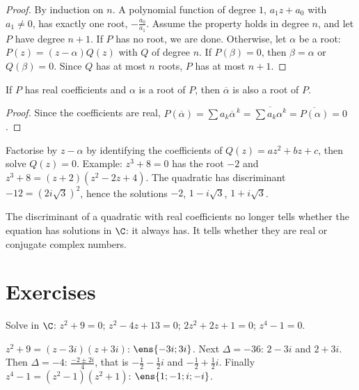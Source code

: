 \begin{proof}
By induction on $n$. A polynomial function of degree $1$, $a_1z+a_0$ with $a_1\neq0$, has exactly one root, $-\frac{a_0}{a_1}$. Assume the property holds in degree $n$, and let $P$ have degree $n+1$. If $P$ has no root, we are done. Otherwise, let $\alpha$ be a root: $P(z)=(z-\alpha)Q(z)$ with $Q$ of degree $n$. If $P(\beta)=0$, then $\beta=\alpha$ or $Q(\beta)=0$. Since $Q$ has at most $n$ roots, $P$ has at most $n+1$.
\end{proof}
\begin{theorem}
If $P$ has real coefficients and $\alpha$ is a root of $P$, then $\overline\alpha$ is also a root of $P$.
\end{theorem}
\begin{proof}
Since the coefficients are real, $P\left(\overline\alpha\right)=\sum a_k\overline\alpha^{\,k}=\overline{\sum a_k\alpha^k}=\overline{P(\alpha)}=0$.
\end{proof}
\begin{method}
Factorise by $z-\alpha$ by identifying the coefficients of $Q(z)=az^2+bz+c$, then solve $Q(z)=0$. Example: $z^3+8=0$ has the root $-2$ and $z^3+8=(z+2)\left(z^2-2z+4\right)$. The quadratic has discriminant $-12=\left(2i\sqrt3\right)^2$, hence the solutions $-2$, $1-i\sqrt3$, $1+i\sqrt3$.
\end{method}
\begin{pitfall}
The discriminant of a quadratic with real coefficients no longer tells whether the equation has solutions in $\C$: it always has. It tells whether they are real or conjugate complex numbers.
\end{pitfall}

\mxnewpage
\section{Exercises}
\begin{exercise}[Quadratics]
Solve in $\C$: $z^2+9=0$; $z^2-4z+13=0$; $2z^2+2z+1=0$; $z^4-1=0$.
\end{exercise}
\begin{solution}
$z^2+9=(z-3i)(z+3i)$: $\ens{-3i;3i}$. Next $\Delta=-36$: $2-3i$ and $2+3i$. Then $\Delta=-4$: $\frac{-2\pm2i}{4}$, that is $-\frac12-\frac12i$ and $-\frac12+\frac12i$. Finally $z^4-1=\left(z^2-1\right)\left(z^2+1\right)$: $\ens{1;-1;i;-i}$.
\end{solution}

